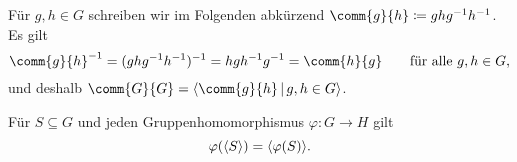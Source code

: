 \section{}

Für $g, h \in G$ schreiben wir im Folgenden abkürzend $\comm{g}{h} \coloneqq ghg^{-1}h^{-1}$.
Es gilt
\[
    \comm{g}{h}^{-1}
  = (g h g^{-1} h^{-1})^{-1}
  = h g h^{-1} g^{-1}
  = \comm{h}{g}
  \qquad
  \text{für alle $g, h \in G$},
\]
und deshalb $\comm{G}{G} = \generated{ \comm{g}{h} \suchthat g, h \in G }$.

\begin{lemma}
  \label{lemma: images and generators}
  Für $S \subseteq G$ und jeden Gruppenhomomorphismus $\varphi \colon G \to H$ gilt
  \[
      \varphi( \langle S\rangle )
    = \langle \varphi(S) \rangle.
  \]
\end{lemma}

